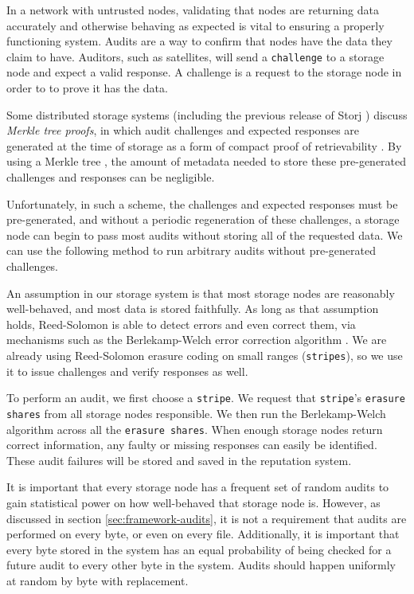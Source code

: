 \documentclass[11pt,fleqn,openany]{book}
\newcommand{\x}[1]{{\tt #1}} \newcommand{\code}[1]{{\em #1}}
\begin{document}
In a network with untrusted nodes, validating that nodes are returning data
accurately and otherwise behaving as expected is vital to ensuring a properly
functioning system. Audits are a way to confirm that nodes have the data they
claim to have. Auditors, such as satellites, will send a \x{challenge} to a
storage node and expect a valid response. A challenge is a request to the
storage node in order to to prove it has the data.

Some distributed storage systems (including the previous release of Storj
\cite{storj-v2}) discuss {\em Merkle tree proofs}, in which audit challenges
and expected responses are generated at the time of storage as a form of compact
proof of retrievability \cite{proof-of-retrievability}. By using a Merkle tree
\cite{merkle-tree}, the amount of metadata needed to store these pre-generated
challenges and responses can be negligible.

Unfortunately, in such a scheme, the challenges and expected responses must be
pre-generated, and without a periodic regeneration of these challenges, a
storage node can begin to pass most audits without storing all of the requested
data. We can use the following method to run arbitrary audits without
pre-generated challenges.

An assumption in our storage system is that most storage nodes are
reasonably well-behaved, and most data is stored faithfully. As long as that
assumption holds, Reed-Solomon is able to detect errors and even correct them,
via mechanisms such as the Berlekamp-Welch error correction algorithm \cite{bw}.
We are already using Reed-Solomon erasure coding
\cite{rs} on small ranges (\x{stripes}), so we use it to issue challenges and
verify responses as well.

To perform an audit, we first choose a \x{stripe}. We request that
\x{stripe}'s \x{erasure shares} from all storage nodes responsible. We then run
the Berlekamp-Welch algorithm \cite{bw} across all the \x{erasure shares}. When
enough storage nodes return correct information, any faulty or missing responses
can easily be identified. These audit failures will be stored and saved in the
reputation system.

It is important that every storage node has a frequent set of random audits to
gain statistical power on how well-behaved that storage node is. However, as
discussed in section \ref{sec:framework-audits}, it is
not a requirement that audits are performed on every byte, or even on every
file.
Additionally, it is important that every byte stored in the system has an equal
probability of being checked for a future audit to every other byte in the
system. Audits should happen uniformly at random by byte with replacement.
\end{document}
